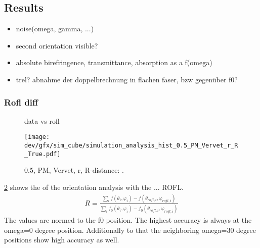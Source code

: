 \subsection{Results}
% 
\begin{itemize}
\item noise(omega, gamma, ...)
\item second orientation visible?
\item absolute birefringence, transmittance, absorption as a f(omega)
\item trel? abnahme der doppelbrechnung in flachen faser, bzw gegenüber f0?
\end{itemize}
% 
% 
% 
\subsubsection{Rofl diff}
% 
\begin{figure}[!t]
\centering
{}
\caption[data vs rofl]{data vs rofl}
\label{fig:sim_05_PM_Vervet_r_r}
\end{figure}
% 
\begin{figure}[!t]
\centering
\texttt{[image: dev/gfx/sim\_cube/simulation\_analysis\_hist\_0.5\_PM\_Vervet\_r\_R\_True.pdf]}
\caption[simulation results mean diff]{0.5, PM, Vervet, r, R-distance: \dummy{}.  }
\label{fig:sim_05_PM_Vervet_r_r}
\end{figure}
% 
% 
\cref{fig:sim_05_PM_Vervet_r_r} shows the  of the orientation analysis with the ... \ac{ROFL}.
\begin{align}
R = \frac{\sum_i f(\theta_i, \varphi_i) -  f(\theta_{\mathit{rofl},i}, \varphi_{\mathit{rofl},i})}{\sum_i f_0(\theta_i, \varphi_i) -  f_0(\theta_{\mathit{rofl},i}, \varphi_{\mathit{rofl},i})}
\end{align}
The values are normed to the f0 position.
The highest accuracy is always at the omega=0 degree position. 
Additionally to that the neighboring omega=30 degree positions show high accuracy as well.

